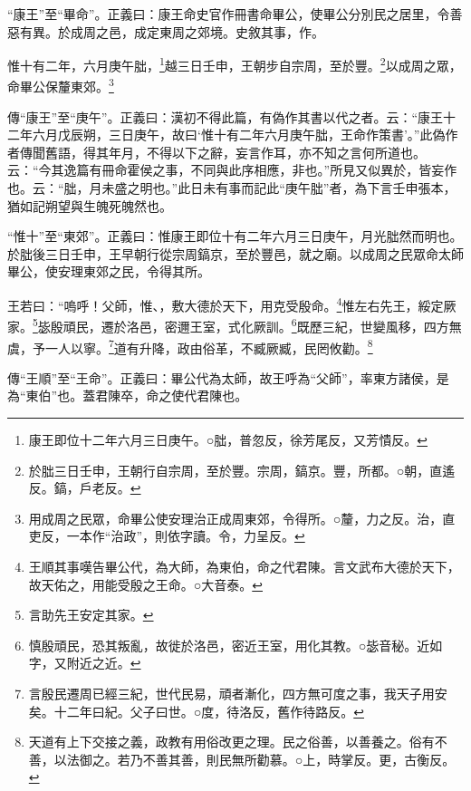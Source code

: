 {\noindent\shu{}\fzkt “康王”至“畢命”。正義曰：康王命史官作冊書命畢公，使畢公分別民之居里，令善惡有異。於成周之邑，成定東周之郊境。史敘其事，作。 \par}

惟十有二年，六月庚午朏，\footnote{康王即位十二年六月三日庚午。○朏，普忽反，徐芳尾反，又芳憒反。}越三日壬申，王朝步自宗周，至於豐。\footnote{於朏三日壬申，王朝行自宗周，至於豐。宗周，鎬京。豐，所都。○朝，直遙反。鎬，戶老反。}以成周之眾，命畢公保釐東郊。\footnote{用成周之民眾，命畢公使安理治正成周東郊，令得所。○釐，力之反。治，直吏反，一本作“治政”，則依字讀。令，力呈反。}


{\noindent\zhuan{}\fzbyks 傳“康王”至“庚午”。正義曰：漢初不得此篇，有偽作其書以代之者。云：“康王十二年六月戊辰朔，三日庚午，故曰‘惟十有二年六月庚午朏，王命作策書’。”此偽作者傳聞舊語，得其年月，不得以下之辭，妄言作耳，亦不知之言何所道也。云：“今其逸篇有冊命霍侯之事，不同與此序相應，非也。”所見又似異於，皆妄作也。云：“朏，月未盛之明也。”此日未有事而記此“庚午朏”者，為下言壬申張本，猶如記朔望與生魄死魄然也。 \par}

{\noindent\shu{}\fzkt “惟十”至“東郊”。正義曰：惟康王即位十有二年六月三日庚午，月光朏然而明也。於朏後三日壬申，王早朝行從宗周鎬京，至於豐邑，就之廟。以成周之民眾命太師畢公，使安理東郊之民，令得其所。 \par}

王若曰：“嗚呼！父師，惟、，敷大德於天下，用克受殷命。\footnote{王順其事嘆告畢公代，為大師，為東伯，命之代君陳。言文武布大德於天下，故天佑之，用能受殷之王命。○大音泰。}惟左右先王，綏定厥家。\footnote{言助先王安定其家。}毖殷頑民，遷於洛邑，密邇王室，式化厥訓。\footnote{慎殷頑民，恐其叛亂，故徙於洛邑，密近王室，用化其教。○毖音秘。近如字，又附近之近。}既歷三紀，世變風移，四方無虞，予一人以寧。\footnote{言殷民遷周已經三紀，世代民易，頑者漸化，四方無可度之事，我天子用安矣。十二年曰紀。父子曰世。○度，待洛反，舊作待路反。}道有升降，政由俗革，不臧厥臧，民罔攸勸。\footnote{天道有上下交接之義，政教有用俗改更之理。民之俗善，以善養之。俗有不善，以法御之。若乃不善其善，則民無所勸慕。○上，時掌反。更，古衡反。}


{\noindent\zhuan{}\fzbyks 傳“王順”至“王命”。正義曰：畢公代為太師，故王呼為“父師”，率東方諸侯，是為“東伯”也。蓋君陳卒，命之使代君陳也。 \par}

